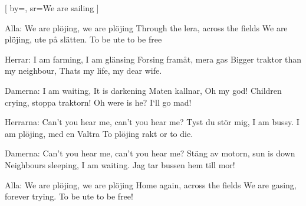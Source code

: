 
[ 			
	by={},			
	sr={We are sailing}					%
	]				
	
\beginverse*						
Alla: 
We are plöjing, we are plöjing
Through the lera, across the fields
We are plöjing, ute på slätten.
To be ute to be free
\endverse					%

\beginchorus							
Herrar:
I am farming, I am glänsing
Forsing framåt, mera gas
Bigger traktor than my neighbour,
Thats my life, my dear wife.
\endchorus							%

\beginverse*							
Damerna:
I am waiting, It is darkening
Maten kallnar, Oh my god!
Children crying, stoppa traktorn!
Oh were is he? I`ll go mad!
\endverse							%

\beginchorus							
Herrarna:
Can't you hear me, can't you hear me?
Tyst du stör mig, I am bussy.
I am plöjing, med en Valtra
To plöjing rakt or to die.
\endchorus							%

\newpage
\beginverse*							
Damerna:
Can't you hear me, can't you hear me?
Stäng av motorn, sun is down
Neighbours sleeping, I am waiting.
Jag tar bussen hem till mor!
\endverse							%

\beginverse*							
Alla:
We are plöjing, we are plöjing
Home again, across the fields
We are gasing, forever trying.
To be ute to be free!
\endverse							%

\vspace{10mm}
\endsong							